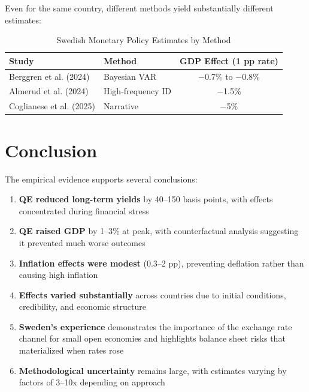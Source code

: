 \documentclass[11pt,a4paper]{article}
\begin{document}
Even for the same country, different methods yield substantially different estimates:

\begin{table}[H]
\centering
\caption{Swedish Monetary Policy Estimates by Method}
\label{tab:sweden_methods}
\begin{tabular}{llc}
\toprule
\textbf{Study} & \textbf{Method} & \textbf{GDP Effect (1 pp rate)} \\
\midrule
Berggren et al. (2024) & Bayesian VAR & $-$0.7\% to $-$0.8\% \\
Almerud et al. (2024) & High-frequency ID & $-$1.5\% \\
Coglianese et al. (2025) & Narrative & $-$5\% \\
\bottomrule
\end{tabular}
\end{table}

\section{Conclusion}

The empirical evidence supports several conclusions:

\begin{enumerate}
    \item \textbf{QE reduced long-term yields} by 40--150 basis points, with effects concentrated during financial stress

    \item \textbf{QE raised GDP} by 1--3\% at peak, with counterfactual analysis suggesting it prevented much worse outcomes

    \item \textbf{Inflation effects were modest} (0.3--2 pp), preventing deflation rather than causing high inflation

    \item \textbf{Effects varied substantially} across countries due to initial conditions, credibility, and economic structure

    \item \textbf{Sweden's experience} demonstrates the importance of the exchange rate channel for small open economies and highlights balance sheet risks that materialized when rates rose

    \item \textbf{Methodological uncertainty} remains large, with estimates varying by factors of 3--10x depending on approach
\end{enumerate}
\end{document}
